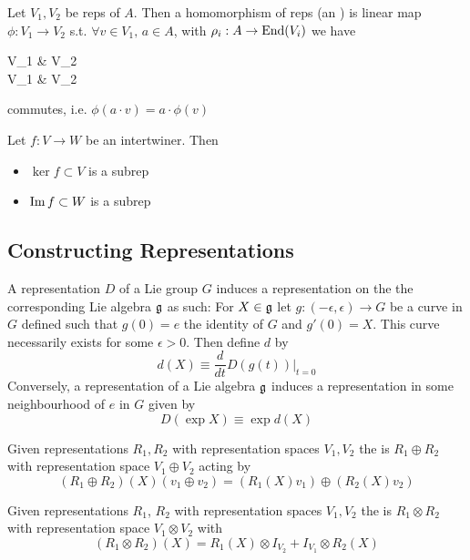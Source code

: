 \documentclass{article}
\begin{document}
\begin{definition}
	Let $V_1,V_2$ be reps of $A$. Then a homomorphism of reps (an ) is linear map $\phi: V_1 \to V_2$ s.t. $\forall v \in V_1, \, a \in A$, with $\rho_i : A \to \operatorname{End}(V_i)$ we have 
	\begin{tkz}
		V_1 \arrow[r,"\phi"] \arrow[d,"\rho_1(a)"'] & V_2 \arrow[d,"\rho_2(a)"] \\ V_1 \arrow[r,"\phi"'] & V_2 
	\end{tkz}
	commutes, i.e. $\phi(a \cdot v) = a \cdot \phi(v)$
\end{definition}

\begin{prop}
	Let $f: V \to W$ be an intertwiner. Then 
	\begin{itemize}
		\item $\ker f \subset V$ is a subrep
		\item $\operatorname{Im} f \subset W$ is a subrep
	\end{itemize}
\end{prop}


\subsection{Constructing Representations}

\begin{theorem}
	A representation $D$ of a Lie group $G$ induces a representation on the the corresponding Lie algebra $\mathfrak{g}$ as such: For $X\in\mathfrak{g}$ let $g:(-\epsilon, \epsilon)\to G$ be a curve in $G$ defined such that $g(0)=e$ the identity of $G$ and $g'(0)=X$. This curve necessarily exists for some $\epsilon>0$. Then define $d$ by \[
	d(X)\equiv\frac{d}{dt} D\left(g(t)\right) \vert_{t=0}
	\]
	Conversely, a representation of a Lie algebra $\mathfrak{g}$ induces a representation in some neighbourhood of $e$ in $G$ given by 
	\[
	D(\exp{X})\equiv\exp{d(X)}
	\]
\end{theorem}

\begin{definition}
	Given representations $R_1, R_2$ with representation spaces $V_1, V_2$ the  is $R_1 \oplus R_2$ with representation space $V_1 \oplus V_2$ acting by 
	\[
	(R_1 \oplus R_2)(X)(v_1 \oplus v_2)=(R_1(X)v_1)\oplus(R_2(X)v_2)
	\]
\end{definition}

\begin{definition}
	Given representations $R_1$, $R_2$ with representation spaces $V_1, V_2$ the  is $R_1 \otimes R_2$ with representation space $V_1 \otimes V_2$ with
	\[
	(R_1 \otimes R_2)(X)=R_1(X)\otimes I_{V_2}+I_{V_1}\otimes R_2(X)
	\]
\end{definition}
\end{document}
